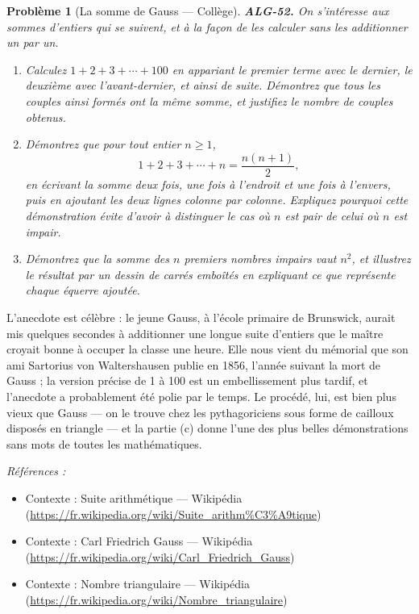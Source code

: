 \documentclass[11pt]{article}
\newtheorem{problem}{Problème}
\newenvironment{refs}{\par\small\noindent\emph{Références :}\begin{itemize}\setlength\itemsep{0pt}}{\end{itemize}\normalsize}
\begin{document}
\begin{problem}[{La somme de Gauss --- Collège}]
\textbf{ALG-52.} On s'intéresse aux sommes d'entiers qui se suivent, et à la façon de les
calculer sans les additionner un par un.
\begin{enumerate}
\item[(a)] Calculez $ 1 + 2 + 3 + \cdots + 100 $ en appariant le premier terme avec le dernier, le
deuxième avec l'avant-dernier, et ainsi de suite. Démontrez que tous les couples ainsi formés ont
la même somme, et justifiez le nombre de couples obtenus.
\item[(b)] Démontrez que pour tout entier $ n \ge 1 $,
\[ 1 + 2 + 3 + \cdots + n = \frac{n(n+1)}{2} , \]
en écrivant la somme deux fois, une fois à l'endroit et une fois à l'envers, puis en ajoutant les
deux lignes colonne par colonne. Expliquez pourquoi cette démonstration évite d'avoir à distinguer
le cas où $ n $ est pair de celui où $ n $ est impair.
\item[(c)] Démontrez que la somme des $ n $ premiers nombres impairs vaut $ n^2 $, et illustrez le
résultat par un dessin de carrés emboîtés en expliquant ce que représente chaque équerre
ajoutée.
\end{enumerate}

\end{problem}

\noindent L'anecdote est célèbre : le jeune Gauss, à l'école primaire de Brunswick, aurait
mis quelques secondes à additionner une longue suite d'entiers que le maître croyait bonne à
occuper la classe une heure. Elle nous vient du mémorial que son ami Sartorius von Waltershausen
publie en 1856, l'année suivant la mort de Gauss ; la version précise \og{} de 1 à 100 \fg{} est un
embellissement plus tardif, et l'anecdote a probablement été polie par le temps. Le procédé, lui,
est bien plus vieux que Gauss --- on le trouve chez les pythagoriciens sous forme de cailloux
disposés en triangle --- et la partie (c) donne l'une des plus belles démonstrations sans mots de
toutes les mathématiques.

\begin{refs}
\item Contexte : Suite arithmétique --- Wikipédia (\url{https://fr.wikipedia.org/wiki/Suite_arithm%C3%A9tique})
\item Contexte : Carl Friedrich Gauss --- Wikipédia (\url{https://fr.wikipedia.org/wiki/Carl_Friedrich_Gauss})
\item Contexte : Nombre triangulaire --- Wikipédia (\url{https://fr.wikipedia.org/wiki/Nombre_triangulaire})
\end{refs}
\end{document}
